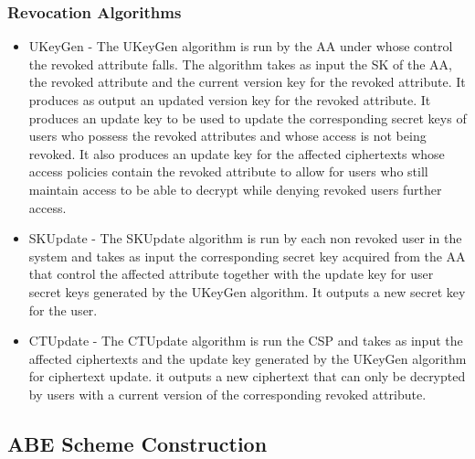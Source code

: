 \subsubsection*{Revocation Algorithms}
\begin{itemize}
	\item UKeyGen - The UKeyGen algorithm is run by the AA under whose control the revoked attribute falls. The algorithm takes as input the SK of the AA, the revoked attribute and the current version key for the revoked attribute. It produces as output an updated version key for the revoked attribute. It produces an update key to be used to update the corresponding secret keys of users who possess the revoked attributes and whose access is not being revoked. It also produces an update key for the affected ciphertexts whose access policies contain the revoked attribute to allow for users who still maintain access to be able to decrypt while denying revoked users further access.
	
	\item SKUpdate - The SKUpdate algorithm is run by each non revoked user in the system and takes as input the corresponding secret key acquired from the AA that control the affected attribute together with the update key for user secret keys generated by the UKeyGen algorithm. It outputs a new secret key for the user.
	
	\item CTUpdate - The CTUpdate algorithm is run the CSP and takes as input the affected ciphertexts and the update key generated by the UKeyGen algorithm for ciphertext update. it outputs a new ciphertext that can only be decrypted by users with a current version of the corresponding revoked attribute.
	
\end{itemize}


\subsection{ABE Scheme Construction}


